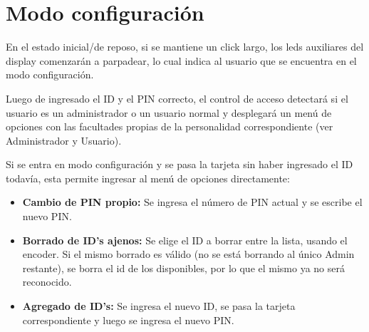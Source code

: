 \documentclass[10pt,a4paper]{article}
\begin{document}
\begin{comment}
Si al estar completando el PIN uno quiere volver a ingresar el ID, lo podrá hacer con un click largo al estar completando el primer carácter. Si en cambio, el usuario realiza un click todavía más largo (sin importar cuál carácter se esté completando), el mismo podrá volver a completar el ID. El PIN no será mostrado luego de completado.\par
Dado que el PIN puede ser de cuatro o cinco dígitos, si el mismo es de cuatro dígitos, deberá completarse con un carácter nulo el quinto dígito. \par
Si el PIN es correcto, la puerta se abrirá. De lo contrario, el PIN es incorrecto. Si el PIN es incorrecto, el usuario será notificado y deberá volver a ingresar su PIN, para el cual tendrá tres intentos totales (contando al primero), luego de los cuales será bloqueado.\par
\end{comment}


\section{Modo configuración}
En el estado inicial/de reposo, si se mantiene un click largo, los leds auxiliares del display comenzarán a parpadear, lo cual indica al usuario que se encuentra en el modo configuración.\par
Luego de ingresado el ID y el PIN correcto, el control de acceso detectará si el usuario es un administrador o un usuario normal y desplegará un menú de opciones con las facultades propias de la personalidad correspondiente (ver Administrador y Usuario).\par
Si se entra en modo configuración y se pasa la tarjeta sin haber ingresado el ID todavía, esta permite ingresar al menú de opciones directamente:
\begin{itemize}
\item \textbf{Cambio de PIN propio: } Se ingresa el número de PIN actual y se escribe el nuevo PIN.
\item \textbf{Borrado de ID's ajenos: } Se elige el ID a borrar entre la lista, usando el encoder. Si el mismo borrado es válido (no se está borrando al único Admin restante), se borra el id de los disponibles, por lo que el mismo ya no será reconocido.
\item \textbf{Agregado de ID's: } Se ingresa el nuevo ID, se pasa la tarjeta correspondiente y luego se ingresa el nuevo PIN.
\end{itemize}
\end{document}
